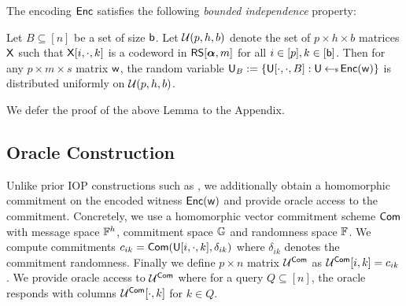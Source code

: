 The encoding $\mathsf{Enc}$ satisfies the following {\em bounded independence} property:
\begin{lemma}\label{lem:boundedindependence}
Let $B\subseteq [n]$ be a set of size $\mathsf{b}$. Let $\mathcal{U}(p,h,b)$ denote the
set of $p\times h\times b$ matrices $\mathsf{X}$ such
that $\mathsf{X}[i,\cdot,k]$ is a codeword in $\mathsf{RS}[\bm{\alpha},m]$ for all $i\in
[p],k\in [\mathsf{b}]$. Then for any $p\times m\times s$ matrix $\mathsf{w}$, the random
variable $\mathsf{U}_B := \{\mathsf{U}[\cdot,\cdot,B]: \mathsf{U}\hskip2.3pt{\gets\!\!\mbox{\tiny${\$}$\normalsize}}\, \mathsf{Enc}(\mathsf{w})\}$ is
distributed uniformly on $\mathcal{U}(p,h,b)$.
\end{lemma}
We defer the proof of the above Lemma to the Appendix.

\subsection{Oracle Construction}\label{sec:construct_oracle} 
Unlike prior IOP constructions such as \cite{ligero, aurora}, we additionally
obtain a homomorphic commitment on the encoded witness $\mathsf{Enc}(\mathsf{w})$ and provide
oracle access to the commitment. Concretely, we use a
homomorphic vector commitment scheme $\mathsf{Com}$ with message space $\mathbb{F}^h$,
commitment space $\mathbb{G}$ and randomness space $\mathbb{F}$. We compute commitments
$c_{ik}=\mathsf{Com}(\mathsf{U}[i,\cdot,k],\delta_{ik})$ where $\delta_{ik}$ denotes the
commitment randomness. Finally we define $p\times n$ matrix $\mathcal{U}^{\mathsf{Com}}$ as
$\mathcal{U}^{\mathsf{Com}}[i,k]=c_{ik}$. We provide oracle access to $\mathcal{U}^{\mathsf{Com}}$ where for a
query $Q\subseteq [n]$, the oracle responds with columns $\mathcal{U}^{\mathsf{Com}}[\cdot,k]$ for
$k\in Q$.

